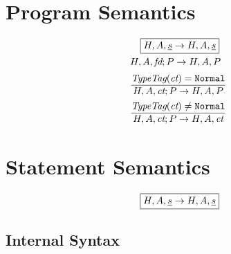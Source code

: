 \documentclass[a4paper, leqno]{amsart}
\def\inblue{\color{blue}}
\newcommand{\ir}[1]{\ensuremath{\underline{#1}}}
\begin{document}
\section{Program Semantics}
\[
\begin{array}{l@{}l@{}ll}
\multicolumn{4}{c}{\fbox{$H,A,\ir{s} \rightarrow H,A,\ir{s}$}} \\[.5em]
& \ \ & H,A,\emph{fd}; P \rightarrow H,A,P & \\[.5em]
 & \ \ & \frac{
    \begin{matrix}
       \emph{TypeTag}(\emph{ct}) = {\tt Normal}
    \end{matrix}}{
    \begin{matrix}
       H,A,\emph{ct}; P \rightarrow H,A,P
    \end{matrix}} & \\[1em]
 & \ \ & \frac{
    \begin{matrix}
       \emph{TypeTag}(\emph{ct}) \neq {\tt Normal}
    \end{matrix}}{
    \begin{matrix}
       H,A,\emph{ct}; P \rightarrow H,A,\emph{ct}
    \end{matrix}} & \\
\end{array}
\]

{\inblue

\section{Statement Semantics}
\[
\begin{array}{c}
\fbox{$H,A,\ir{s} \rightarrow H,A,\ir{s}$}
 \end{array}
\]
}

\subsection{Internal Syntax}
\end{document}
